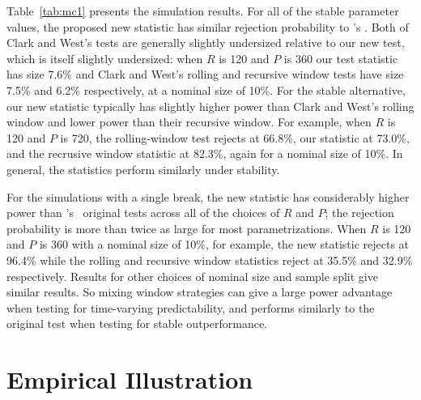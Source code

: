 \documentclass[12pt,fleqn]{article}
\newcommand\citepos[2][]{\citeauthor{#2}'s \citeyearpar[#1]{#2}}
\newcommand\poscw{\citeauthor{ClW:06}'s \citeyearpar{ClW:06,ClW:07}}
\providecommand\testsize{[missing]}
\providecommand\totalsims{[missing]}
\theoremstyle{definition}
\newcommand{\oos}{OOS}
\begin{document}
\begin{table}[tb]
  \centering
  
  \caption{Size and power of the \oos\ tests in the simulations 
    described by Section~\ref{sec:2}, at
    \testsize\% confidence.  These percentages are calculated from \totalsims\
    samples.  Pr[CW roll.] shows the fraction of simulations for
    which Clark and West's (2007) rolling-window statistic rejects; 
    Pr[CW rec.] shows the fraction of simulations for which
    their recursive-window statistic rejects; and Pr[new] shows the fraction of
    simulations for which this paper's test rejects.}
\label{tab:mc1}
\end{table}

Table~\ref{tab:mc1} presents the simulation results.  For all of the
stable parameter values, the proposed new statistic has similar
rejection probability to \citepos{ClW:07}.  Both of Clark and West's
tests are generally slightly undersized relative to our new test,
which is itself slightly undersized: when $R$ is 120 and $P$ is 360
our test statistic has size 7.6\% and Clark and West's rolling and
recursive window tests have size 7.5\% and 6.2\% respectively, at a
nominal size of 10\%.  For the stable alternative, our new statistic
typically has slightly higher power than Clark and West's rolling
window and lower power than their recursive window.  For example, when
$R$ is 120 and $P$ is 720, the rolling-window test rejects at 66.8\%,
our statistic at 73.0\%, and the recrusive window statistic at 82.3\%,
again for a nominal size of 10\%.  In general, the statistics perform
similarly under stability.

For the simulations with a single break, the new statistic has
considerably higher power than \poscw\ original tests across all of
the choices of $R$ and $P$; the rejection probability is more than
twice as large for most parametrizations.  When $R$ is 120 and $P$ is
360 with a nominal size of 10\%, for example, the new statistic
rejects at 96.4\% while the rolling and recursive window statistics
reject at 35.5\% and 32.9\% respectively.  Results for other choices
of nominal size and sample split give similar results.  So mixing
window strategies can give a large power advantage when testing for
time-varying predictability, and performs similarly to the original
test when testing for stable outperformance.

\section{Empirical Illustration}\label{sec:3}
\end{document}
